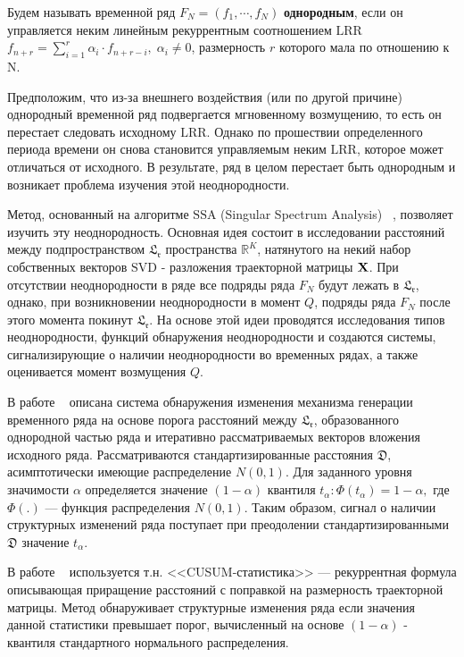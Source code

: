 \documentclass[specialist, substylefile = spbu.rtx,
			   subf, href, 12pt]{disser}
\begin{document}
\intro
Будем называть временной ряд $F_N = (f_1, \cdots, f_{N})$ \textbf{однородным}, если он управляется неким линейным рекуррентным соотношением $\mathrm{LRR}$ $f_{n+r} = \sum_{i=1}^{r} \alpha_i\cdot f_{n+r-i}, \; \alpha_i \neq 0$, размерность $ r $ которого мала по отношению к $\mathrm{N}$. 

Предположим, что из-за внешнего воздействия (или по другой причине) однородный временной ряд подвергается мгновенному возмущению, то есть он перестает следовать исходному $\mathrm{LRR}$. Однако по прошествии определенного периода времени он снова становится управляемым неким $\mathrm{LRR}$, которое может отличаться от исходного. В результате, ряд в целом перестает быть однородным и возникает проблема изучения этой неоднородности.

Метод, основанный на алгоритме $ \mathrm{SSA} $ (Singular Spectrum Analysis) ~\cite{Golyandina2001, rssa_package, RSSA_BASIC}, позволяет изучить эту неоднородность. Основная идея состоит в исследовании расстояний между подпространством $ \mathfrak{L_r} $ пространства $ \mathbb{R}^K $, натянутого на некий набор собственных векторов $ \mathrm{SVD} $ - разложения траекторной матрицы $ \bold{X} $. При отсутствии неоднородности в ряде все подряды ряда $ F_N $ будут лежать в $ \mathfrak{L_r} $, однако, при возникновении неоднородности в момент $ Q $, подряды ряда $ F_N $ после этого момента покинут $ \mathfrak{L_r} $. На основе этой идеи проводятся исследования типов неоднородности, функций обнаружения неоднородности и создаются системы, сигнализирующие о наличии неоднородности во временных рядах, а также оценивается момент возмущения $ Q $.

В работе ~\cite{Moskvina2010ChangeP} описана система обнаружения изменения механизма генерации временного ряда на основе порога расстояний между $ \mathfrak{L_r} $, образованного однородной частью ряда и итеративно рассматриваемых векторов вложения исходного ряда. Рассматриваются стандартизированные расстояния $ \mathfrak{D} $, асимптотически имеющие распределение $ N(0, 1)$. Для заданного уровня значимости $ \alpha $ определяется значение $ (1-\alpha) $ квантиля $ t_\alpha: \Phi(t_\alpha) = 1 - \alpha, $ где $ \Phi(.) $ --- функция распределения $ N(0, 1) $. Таким образом, сигнал о наличии структурных изменений ряда поступает при преодолении стандартизированными $ \mathfrak{D} $ значение $ t_\alpha $. 

В работе ~\cite{CPD} используется т.н. <<CUSUM-статистика>> --- рекуррентная формула описывающая приращение расстояний с поправкой на размерность траекторной матрицы. Метод обнаруживает структурные изменения ряда если значения данной статистики превышает порог, вычисленный на основе $ (1 - \alpha) $ - квантиля стандартного нормального распределения.
\end{document}
